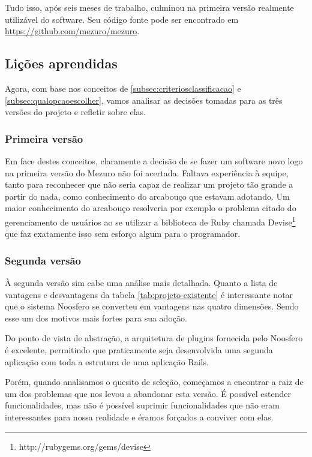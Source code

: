 \documentclass[12pt]{article}
\begin{document}
  Tudo isso, após seis meses de trabalho, culminou na primeira versão realmente utilizável do software. Seu código fonte pode ser encontrado em \url{https://github.com/mezuro/mezuro}.

  \subsection{Lições aprendidas} \label{subsec:licoes-aprendidas}
  Agora, com base nos conceitos de \ref{subsec:criteriosclassificacao} e \ref{subsec:qualopcaoescolher}, vamos analisar as decisões tomadas para as três versões do projeto e refletir sobre elas.

    \subsubsection{Primeira versão}
    Em face destes conceitos, claramente a decisão de se fazer um software novo logo na primeira versão do Mezuro não foi acertada. Faltava experiência à equipe, tanto para reconhecer que não seria capaz de realizar um projeto tão grande a partir do nada, como conhecimento do arcabouço que estavam adotando. Um maior conhecimento do arcabouço resolveria por exemplo o problema citado do gerenciamento de usuários ao se utilizar a biblioteca de Ruby chamada Devise\footnote{http://rubygems.org/gems/devise} que faz exatamente isso sem esforço algum para o programador.

    \subsubsection{Segunda versão} \label{subsubsec:segundaversao}
    À segunda versão sim cabe uma análise mais detalhada. Quanto a lista de vantagens e desvantagens da tabela \ref{tab:projeto-existente} é interessante notar que o sistema Noosfero se converteu em vantagens nas quatro dimensões. Sendo esse um dos motivos mais fortes para sua adoção.

    Do ponto de vista de abstração, a arquitetura de plugins fornecida pelo Noosfero é excelente, permitindo que praticamente seja desenvolvida uma segunda aplicação com toda a estrutura de uma aplicação Rails.

    Porém, quando analisamos o quesito de seleção, começamos a encontrar a raiz de um dos problemas que nos levou a abandonar esta versão. É possível estender funcionalidades, mas não é possível suprimir funcionalidades que não eram interessantes para nossa realidade e éramos forçados a conviver com elas.
\end{document}
